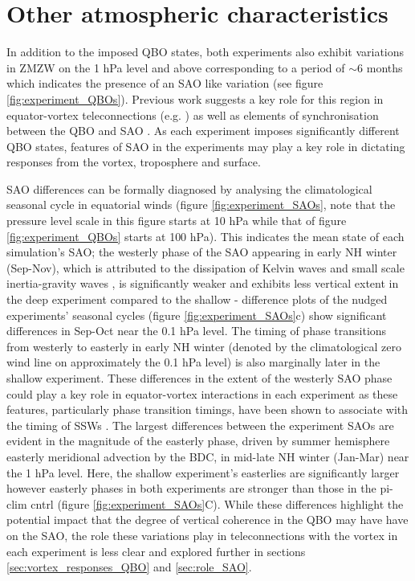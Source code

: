 \section{Other atmospheric characteristics}

In addition to the imposed QBO states, both experiments also exhibit variations in ZMZW on the 1 hPa level and above corresponding to a period of $\sim$6 months which indicates the presence of an SAO like variation (see figure \ref{fig:experiment_QBOs}). Previous work suggests a key role for this region in equator-vortex teleconnections (e.g. \cite{grayForecasting2020a}) as well as elements of synchronisation between the QBO and SAO \citep{kuaiNonstationary2009c}. As each experiment imposes significantly different QBO states, features of SAO in the experiments may play a key role in dictating responses from the vortex, troposphere and surface.

SAO differences can be formally diagnosed by analysing the climatological seasonal cycle in equatorial winds (figure \ref{fig:experiment_SAOs}, note that the pressure level scale in this figure starts at 10 hPa while that of figure \ref{fig:experiment_QBOs} starts at 100 hPa). This indicates the mean state of each simulation's SAO; the westerly phase of the SAO appearing in early NH winter (Sep-Nov), which is attributed to the dissipation of Kelvin waves and small scale inertia-gravity waves \citep{dunkertonRole1979, hitchmanEstimation1988}, is significantly weaker and exhibits less vertical extent in the deep experiment compared to the shallow - difference plots of the nudged experiments' seasonal cycles (figure \ref{fig:experiment_SAOs}c) show significant differences in Sep-Oct near the 0.1 hPa level. The timing of phase transitions from westerly to easterly in early NH winter (denoted by the climatological zero wind line on approximately the 0.1 hPa level) is also marginally later in the shallow experiment. These differences in the extent of the westerly SAO phase could play a key role in equator-vortex interactions in each experiment as these features, particularly phase transition timings, have been shown to associate with the timing of SSWs \citep{grayData2001, hamiltonEffects1998}. The largest differences between the experiment SAOs are evident in the magnitude of the easterly phase, driven by summer hemisphere easterly meridional advection by the BDC, in mid-late NH winter (Jan-Mar) near the 1 hPa level. Here, the shallow experiment's easterlies are significantly larger however easterly phases in both experiments are stronger than those in the pi-clim cntrl (figure \ref{fig:experiment_SAOs}C). While these differences highlight the potential impact that the degree of vertical coherence in the QBO may have have on the SAO, the role these variations play in teleconnections with the vortex in each experiment is less clear and explored further in sections \ref{sec:vortex_responses_QBO} and \ref{sec:role_SAO}.

